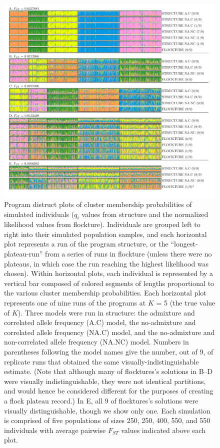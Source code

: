  \begin{figure}
\centering
  \includegraphics[width=.8\linewidth]{images/Figures-Pat/FlockturevStructureDistruct.pdf}%
  \caption{
  Program {\sc distruct} plots of cluster membership probabilities of simulated individuals
  ($q_i$ values from {\sc structure} and the normalized likelihood values from {\sc flockture}). 
  Individuals are grouped left to right into their simulated population samples, and each 
  horizontal plot represents a run of the program
  {\sc structure}, or the ``longest-plateau-run'' from a series of runs in {\sc flockture} (unless
  there were no plateaus, in which case the run reaching the highest likelihood was chosen).
  Within horizontal plots, each individual is represented by a vertical bar composed of colored
  segments of lengths proportional to the various cluster membership probabilities.
  Each horizontal plot
  represents one of nine 
 runs of the programs  at $K$ = 5 (the true value of $K$). Three models were run in structure: the admixture and correlated allele 
  frequency (A.C) model, 
the no-admixture and correlated allele frequency (NA.C) model, 
and the no-admixture and non-correlated allele frequency (NA.NC) model. Numbers in 
parentheses following the model names give the number, out of 9, of replicate runs
that obtained the same visually-indistinguishable estimate. (Note that although many of {\sc flocktures}'s solutions in B--D were visually indistinguishable, they were not identical partitions, and would
hence be considered different for the purposes of creating a {\sc flock} plateau record.) In E, all 9
of {\sc flocktures}'s solutions were visually distinguishable, though we show only one.  Each simulation is comprised of
 five populations of sizes 250, 250, 400, 550, and 550 individuals with average pairwise $F_{ST}$ values
 indicated above each plot.}
  \label{fig:FvSdistruct}
\end{figure}

